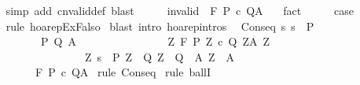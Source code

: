 \begin{isabellebody}
\ \ \ \ \isamarkupfalse%
\ {\isacharparenleft}simp\ add{\isacharcolon}\ cnvalid{\isacharunderscore}def{\isacharparenright}\ blast\isanewline
\ \ \isamarkupfalse%
\ \isamarkupfalse%
\ invalid{\isacharcolon}\ {\isachardoublequoteopen}{\isasymnot}\ {\isasymGamma}{\isasymTurnstile}\isactrlbsub {\isacharslash}F\isactrlesub \ P\ c\ Q{\isacharcomma}A{\isachardoublequoteclose}\ \ \isamarkupfalse%
\ fact\isanewline
\ \ \isamarkupfalse%
\ \isamarkupfalse%
\ {\isacharquery}case\isanewline
\ \ \ \ \isamarkupfalse%
\ {\isacharparenleft}rule\ hoarep{\isachardot}ExFalso{\isacharparenright}\isanewline
{}\isamarkupfalse%
\ {\isacharparenleft}blast\ intro{\isacharcolon}\ hoarep{\isachardot}intros{\isacharparenright}{\isacharplus}%
\endisatagproof
{\isafoldproof}%
%
\isadelimproof
%
\endisadelimproof
%
\isamarkuptrue%
\isamarkupfalse%
\ \ Conseq{\isacharprime}{\isacharcolon}\ {\isachardoublequoteopen}{\isasymforall}s{\isachardot}\ s\ {\isasymin}\ P\ {\isasymlongrightarrow}\ \isanewline
\ \ \ \ \ \ \ \ \ \ \ \ {\isacharparenleft}{\isasymexists}P{\isacharprime}\ Q{\isacharprime}\ A{\isacharprime}{\isachardot}\ \isanewline
\ \ \ \ \ \ \ \ \ \ \ \ \ \ {\isacharparenleft}{\isasymforall}\ Z{\isachardot}\ {\isasymGamma}{\isacharcomma}{\isasymTheta}{\isasymturnstile}\isactrlbsub {\isacharslash}F\isactrlesub \ {\isacharparenleft}P{\isacharprime}\ Z{\isacharparenright}\ c\ {\isacharparenleft}Q{\isacharprime}\ Z{\isacharparenright}{\isacharcomma}{\isacharparenleft}A{\isacharprime}\ Z{\isacharparenright}{\isacharparenright}\ {\isasymand}\isanewline
\ \ \ \ \ \ \ \ \ \ \ \ \ \ \ \ \ \ \ \ {\isacharparenleft}{\isasymexists}Z{\isachardot}\ s\ {\isasymin}\ P{\isacharprime}\ Z\ {\isasymand}\ {\isacharparenleft}Q{\isacharprime}\ Z\ {\isasymsubseteq}\ Q{\isacharparenright}\ {\isasymand}\ {\isacharparenleft}A{\isacharprime}\ Z\ {\isasymsubseteq}\ A{\isacharparenright}{\isacharparenright}{\isacharparenright}\isanewline
\ \ \ \ \ \ \ \ \ \ \ {\isasymLongrightarrow}\isanewline
\ \ \ \ \ \ \ \ \ \ \ {\isasymGamma}{\isacharcomma}{\isasymTheta}{\isasymturnstile}\isactrlbsub {\isacharslash}F\isactrlesub \ P\ c\ Q{\isacharcomma}A{\isachardoublequoteclose}\isanewline
%
\isadelimproof
%
\endisadelimproof
%
\isatagproof
{}\isamarkupfalse%
\ {\isacharparenleft}rule\ Conseq{\isacharparenright}\isanewline
{}\isamarkupfalse%
\ {\isacharparenleft}rule\ ballI{\isacharparenright}\isanewline

\end{isabellebody}
